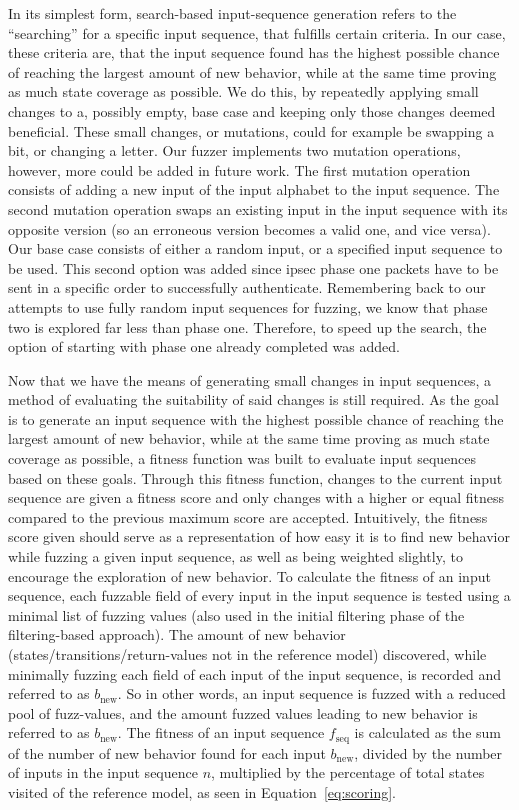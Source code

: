 In its simplest form, search-based input-sequence generation refers to the ``searching'' for a specific input sequence, that fulfills certain criteria. In our case, these criteria are, that the input sequence found has the highest possible chance of reaching the largest amount of new behavior, while at the same time proving as much state coverage as possible. We do this, by repeatedly applying small changes to a, possibly empty, base case and keeping only those changes deemed beneficial. These small changes, or mutations, could for example be swapping a bit, or changing a letter. Our fuzzer implements two mutation operations, however, more could be added in future work. The first mutation operation consists of adding a new input of the input alphabet to the input sequence. The second mutation operation swaps an existing input in the input sequence with its opposite version (so an erroneous version becomes a valid one, and vice versa). Our base case consists of either a random input, or a specified input sequence to be used. This second option was added since \ac{ipsec} phase one packets have to be sent in a specific order to successfully authenticate. Remembering back to our attempts to use fully random input sequences for fuzzing, we know that phase two is explored far less than phase one. Therefore, to speed up the search, the option of starting with phase one already completed was added.

Now that we have the means of generating small changes in input sequences, a method of evaluating the suitability of said changes is still required. As the goal is to generate an input sequence with the highest possible chance of reaching the largest amount of new behavior, while at the same time proving as much state coverage as possible, a fitness function was built to evaluate input sequences based on these goals. Through this fitness function, changes to the current input sequence are given a fitness score and only changes with a higher or equal fitness compared to the previous maximum score are accepted. Intuitively, the fitness score given should serve as a representation of how easy it is to find new behavior while fuzzing a given input sequence, as well as being weighted slightly, to encourage the exploration of new behavior. To calculate the fitness of an input sequence, each fuzzable field of every input in the input sequence is tested using a minimal list of fuzzing values (also used in the initial filtering phase of the filtering-based approach). The amount of new behavior (states/transitions/return-values not in the reference model) discovered, while minimally fuzzing each field of each input of the input sequence, is recorded and referred to as $b_\mathrm{new}$. So in other words, an input sequence is fuzzed with a reduced pool of fuzz-values, and the amount fuzzed values leading to new behavior is referred to as $b_\mathrm{new}$. The fitness of an input sequence $f_\mathrm{seq}$ is calculated as the sum of the number of new behavior found for each input $b_\mathrm{new}$, divided by the number of inputs in the input sequence $n$, multiplied by the percentage of total states visited of the reference model, as seen in Equation~\ref{eq:scoring}.

